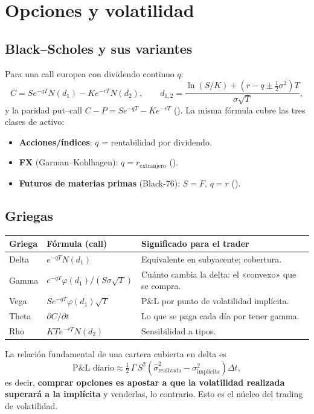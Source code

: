\chapter{Opciones y volatilidad}\label{cap:opciones}

\section{Black--Scholes y sus variantes}
Para una call europea con dividendo continuo $q$:
\begin{equation}
C = S e^{-qT}N(d_1) - K e^{-rT}N(d_2),\qquad d_{1,2}=\frac{\ln(S/K)+(r-q\pm\frac12\sigma^2)T}{\sigma\sqrt T},
\end{equation}
y la paridad put--call $C-P = Se^{-qT}-Ke^{-rT}$ (). La misma fórmula cubre las tres clases de activo:
\begin{itemize}
\item \textbf{Acciones/índices}: $q$ = rentabilidad por dividendo.
\item \textbf{FX} (Garman--Kohlhagen): $q = r_{\text{extranjero}}$ ().
\item \textbf{Futuros de materias primas} (Black-76): $S=F$, $q=r$ ().
\end{itemize}

\section{Griegas}
\begin{table}[h]\centering\small
\begin{tabularx}{\textwidth}{llX}
\toprule
Griega & Fórmula (call) & Significado para el trader \\ \midrule
Delta & $e^{-qT}N(d_1)$ & Equivalente en subyacente; cobertura. \\
Gamma & $e^{-qT}\varphi(d_1)/(S\sigma\sqrt T)$ & Cuánto cambia la delta: el «convexo» que se compra. \\
Vega & $Se^{-qT}\varphi(d_1)\sqrt T$ & P\&L por punto de volatilidad implícita. \\
Theta & $\partial C/\partial t$ & Lo que se paga cada día por tener gamma. \\
Rho & $KTe^{-rT}N(d_2)$ & Sensibilidad a tipos. \\
\bottomrule
\end{tabularx}
\end{table}
La relación fundamental de una cartera cubierta en delta es
\begin{equation}
\text{P\&L diario} \approx \tfrac12\,\Gamma\,S^2\left(\hat\sigma^2_{\text{realizada}}-\sigma^2_{\text{implícita}}\right)\Delta t ,
\end{equation}
es decir, \textbf{comprar opciones es apostar a que la volatilidad realizada superará a la implícita}
y venderlas, lo contrario. Esto es el núcleo del trading de volatilidad.

